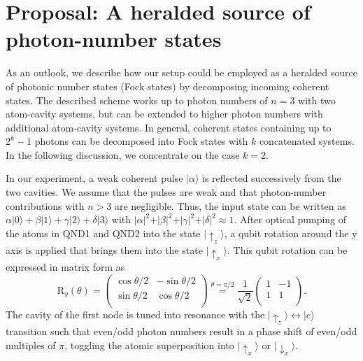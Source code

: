 \documentclass[prl,amsmath,amssymb,bibnotes,aps,longbibliography,12pt]{revtex4-1}
\newcommand{\ket}[1]{|{#1}\rangle}
\begin{document}
\section{Proposal: A heralded source of photon-number states}
\noindent As an outlook, we describe how our setup could be employed as a heralded source of photonic number states (Fock states) by decomposing incoming coherent states. The described scheme works up to photon numbers of $n=3$ with two atom-cavity systems, but can be extended to higher photon numbers with additional atom-cavity systems. In general, coherent states containing up to $2^{k}-1$ photons can be decomposed into Fock states with $k$ concatenated systems. In the following discussion, we concentrate on the case $k=2$. 

In our experiment, a weak coherent pulse $\ket{\alpha}$ is reflected successively from the two cavities. We assume that the pulses are weak and that photon-number contributions with $n>3$ are negligible. Thus, the input state can be written as $\alpha\ket{0}+\beta\ket{1}+\gamma\ket{2}+\delta\ket{3}$ with $\vert\alpha\vert^2+\vert\beta\vert^2+\vert\gamma\vert^2+\vert\delta\vert^2\approx 1$. After optical pumping of the atoms in QND1 and QND2 into the state $\ket{\uparrow_z}$, a qubit rotation around the y axis is applied that brings them into the state $\ket{\uparrow_x}$. This qubit rotation can be expressed in matrix form as \cite{nielsen2002} 
\begin{equation}
\text{R}_y(\theta)=\begin{pmatrix}\cos\theta/2 & -\sin\theta/2 \\\sin\theta/2 & \cos\theta/2\\\end{pmatrix}\overset{\theta=\pi/2}{=}\frac{1}{\sqrt{2}}\begin{pmatrix}1 & -1 \\1 & 1\\\end{pmatrix}.
\end{equation} The cavity of the first node is tuned into resonance with the $\ket{\uparrow_z}\leftrightarrow \ket{e}$ transition such that even/odd photon numbers result in a phase shift of even/odd multiples of $\pi$, toggling the atomic superposition into $\ket{\uparrow_x}$ or $\ket{\downarrow_x}$.
\renewcommand{\thefigure}{S2}
\end{document}
